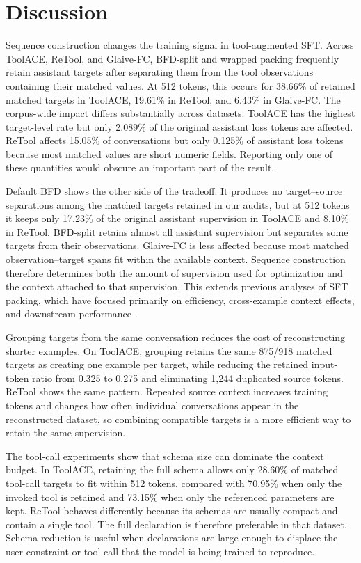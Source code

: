 \documentclass[pdflatex,sn-basic,Numbered]{sn-jnl}
\begin{document}
\FloatBarrier

\section{Discussion}

Sequence construction changes the training signal in tool-augmented SFT. Across ToolACE, ReTool,
and Glaive-FC, BFD-split and wrapped packing frequently retain assistant targets after separating
them from the tool observations containing their matched values. At 512 tokens, this occurs for
38.66\% of retained matched targets in ToolACE, 19.61\% in ReTool, and 6.43\% in Glaive-FC.
The corpus-wide impact differs substantially across datasets. ToolACE has the highest target-level
rate but only 2.089\% of the original assistant loss tokens are affected. ReTool affects 15.05\%
of conversations but only 0.125\% of assistant loss tokens because most matched values are short
numeric fields. Reporting only one of these quantities would obscure an important part of the
result.

Default BFD shows the other side of the tradeoff. It produces no target--source separations among
the matched targets retained in our audits, but at 512 tokens it keeps only 17.23\% of the
original assistant supervision in ToolACE and 8.10\% in ReTool. BFD-split retains almost all
assistant supervision but separates some targets from their observations. Glaive-FC is less
affected because most matched observation--target spans fit within the available context.
Sequence construction therefore determines both the amount of supervision used for optimization
and the context attached to that supervision. This extends previous analyses of SFT packing,
which have focused primarily on efficiency, cross-example context effects, and downstream
performance \citep{wang2024packing}.

Grouping targets from the same conversation reduces the cost of reconstructing shorter examples.
On ToolACE, grouping retains the same 875/918 matched targets as creating one example per target,
while reducing the retained input-token ratio from 0.325 to 0.275 and eliminating 1,244 duplicated
source tokens. ReTool shows the same pattern. Repeated source context increases training tokens
and changes how often individual conversations appear in the reconstructed dataset, so combining
compatible targets is a more efficient way to retain the same supervision.

The tool-call experiments show that schema size can dominate the context budget. In ToolACE,
retaining the full schema allows only 28.60\% of matched tool-call targets to fit within 512
tokens, compared with 70.95\% when only the invoked tool is retained and 73.15\% when only the
referenced parameters are kept. ReTool behaves differently because its schemas are usually
compact and contain a single tool. The full declaration is therefore preferable in that dataset.
Schema reduction is useful when declarations are large enough to displace the user constraint
or tool call that the model is being trained to reproduce.
\end{document}
